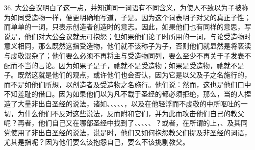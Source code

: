 36. 大公会议明白了这一点，并知道同一词语有不同含义，为使人不致以为子被称为如同受造物一样，便更明确地写道，子是。因为这个词表明子对父的真正子性；而单单的一词，只表示创造者创造时的意志。因此，如果他们也有同样的意思，写说是，他们对大公会议就无可抱怨；但如果他们论子时所用的一词，与论受造物时意义相同，那么既然这指受造物，他们就不该称子为子，否则他们就显然是将亵渎与虔敬混杂了；他们要么必须不再将主与受造物同列，要么至少不再关于子发表不配而不当的言论。因为如果子是子，祂就不是受造物；如果是受造物，祂就不是子。既然这就是他们的观点，或许他们也会否认，因为它是以父及子之名施行的，而不是如他们所想，以创造者及受造物之名施行。他们说：然而，这也是他们口中不知羞耻的借口。因为如果他们以为凡不载于圣经的都必须拒绝，那么，当的人捏造了大量非出自圣经的说法，诸如、、、、、，以及在他轻浮而不虔敬的中所呕吐的一切，为什么他们不反对这些说法，反而附和它们，并为此而攻击他们自己的教父呢？再者，他们自己又在哪部圣经中找到了、、、、、？或者，在所谓的上，、及其同党使用了非出自圣经的说法，说是时，他们又如何抱怨教父们提及非圣经的词语，尤其是指呢？因为他们要么该抱怨自己，要么不该挑剔教父。\par

